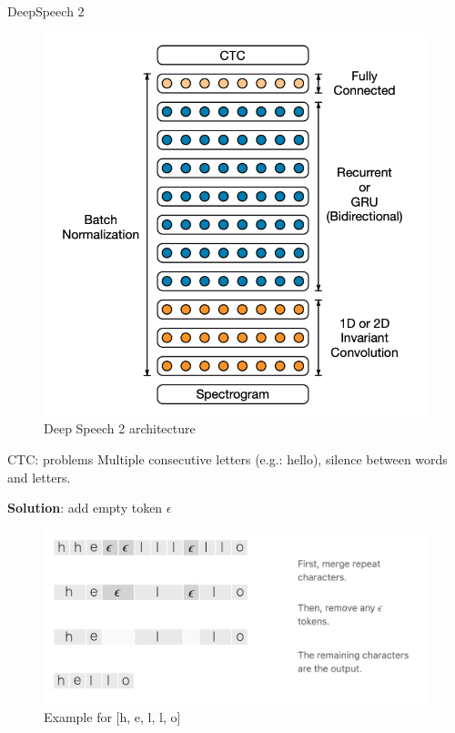 \begin{frame}{DeepSpeech 2}

    \begin{figure}
    	\centering
    	\includegraphics[width=0.6\linewidth]{figs/deepspeech.png}
    	\caption{Deep Speech 2 architecture}

    \end{figure}

\end{frame}

\begin{frame}{CTC: problems}
Multiple consecutive letters (e.g.: hello), silence between words and letters.

\textbf{Solution}: add empty token $\epsilon$
    \begin{figure}
    	\centering
    	\includegraphics[width=0.9\linewidth]{figs/ctc_emptytoken.png}
    	\caption{Example for [h, e, l, l, o]}

    \end{figure}
\end{frame}

